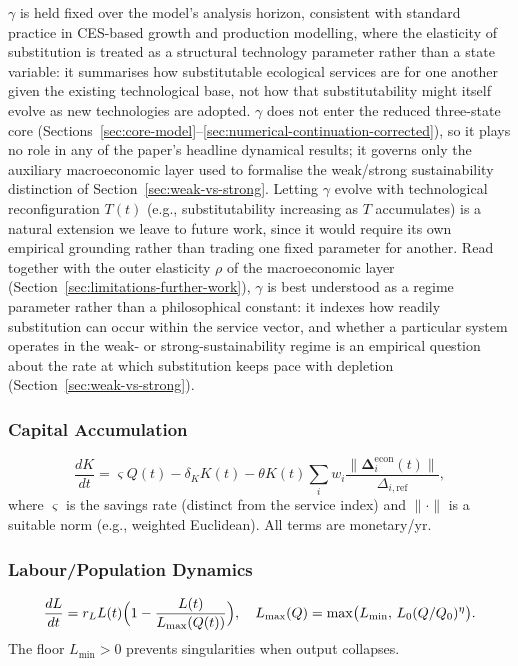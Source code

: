 \documentclass[twocolumn,10pt]{article}
\begin{document}
$\gamma$ is held fixed over the model's analysis horizon, consistent with standard practice in CES-based growth and production modelling, where the elasticity of substitution is treated as a structural technology parameter rather than a state variable: it summarises how substitutable ecological services are for one another given the existing technological base, not how that substitutability might itself evolve as new technologies are adopted. $\gamma$ does not enter the reduced three-state core (Sections~\ref{sec:core-model}--\ref{sec:numerical-continuation-corrected}), so it plays no role in any of the paper's headline dynamical results; it governs only the auxiliary macroeconomic layer used to formalise the weak/strong sustainability distinction of Section~\ref{sec:weak-vs-strong}. Letting $\gamma$ evolve with technological reconfiguration $T(t)$ (e.g., substitutability increasing as $T$ accumulates) is a natural extension we leave to future work, since it would require its own empirical grounding rather than trading one fixed parameter for another. Read together with the outer elasticity $\rho$ of the macroeconomic layer (Section~\ref{sec:limitations-further-work}), $\gamma$ is best understood as a regime parameter rather than a philosophical constant: it indexes how readily substitution can occur within the service vector, and whether a particular system operates in the weak- or strong-sustainability regime is an empirical question about the rate at which substitution keeps pace with depletion (Section~\ref{sec:weak-vs-strong}).

\subsubsection{Capital Accumulation}
\begin{equation}
\frac{dK}{dt} = \varsigma Q(t) - \delta_K K(t) - \theta K(t) \sum_i w_i
                \frac{\|\boldsymbol{\Delta}_i^{\text{econ}}(t)\|}{\Delta_{i,\text{ref}}},
\label{eq:k-corrected}
\end{equation}
where \(\varsigma\) is the savings rate (distinct from the service index) and \(\|\cdot\|\) is a suitable norm (e.g., weighted Euclidean). All terms are monetary/yr.

\subsubsection{Labour/Population Dynamics}
\begin{equation}
\frac{dL}{dt} = r_L L(t) \Bigl( 1 - \frac{L(t)}{L_{\max}(Q(t))} \Bigr), \quad
                L_{\max}(Q) = \max\bigl(L_{\min},\, L_0 (Q/Q_0)^\eta\bigr).
\label{eq:l}
\end{equation}
The floor \(L_{\min} > 0\) prevents singularities when output collapses.
\end{document}
